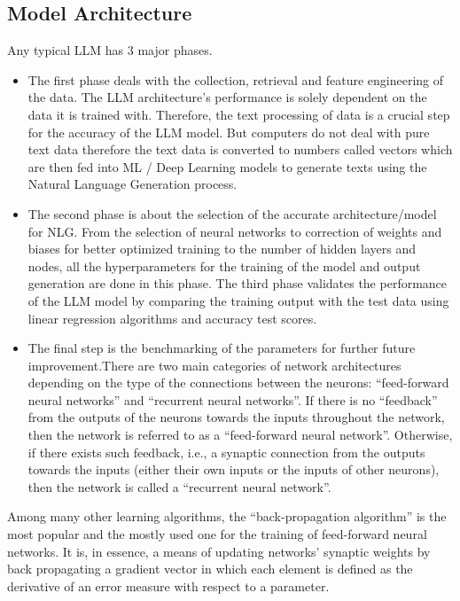 \subsection{Model Architecture}

Any typical LLM has 3 major phases.
\begin{itemize}
    \item The first phase deals with the collection, retrieval and feature engineering of the data.
          The LLM architecture’s performance is solely dependent on the data it is trained with. Therefore, the text processing of data is a crucial step for the accuracy of the LLM model. But computers do not deal with pure text data therefore the text data is converted to numbers called vectors which are then fed into ML / Deep Learning models to generate texts using the Natural Language Generation process.
    \item The second phase is about the selection of the accurate architecture/model for NLG.
          From the selection of neural networks to correction of weights and biases for better optimized training to the number of hidden layers and nodes, all the hyperparameters for the training of the model and output generation are done in this phase. The third phase validates the performance of the LLM model by comparing the training output with the test data using linear regression algorithms and accuracy test scores.
    \item The final step is
          the benchmarking of the parameters for further future improvement.There are two main categories of network architectures depending on the type of the connections between the neurons: “feed-forward neural networks” and “recurrent neural networks”. If there is no “feedback” from the outputs of the neurons towards the inputs throughout the network, then the network is referred to as a “feed-forward neural network”. Otherwise, if there exists such feedback, i.e., a synaptic connection from the outputs towards the inputs (either their own inputs or the inputs of other neurons), then the network is called a “recurrent neural network”.
\end{itemize}

Among many other learning algorithms, the “back-propagation algorithm” is the most
popular and the mostly used one for the training of feed-forward neural networks. It is, in essence, a means of updating networks’ synaptic weights by back propagating a gradient vector in which each element is defined as the derivative of an error measure with respect
to a parameter.

